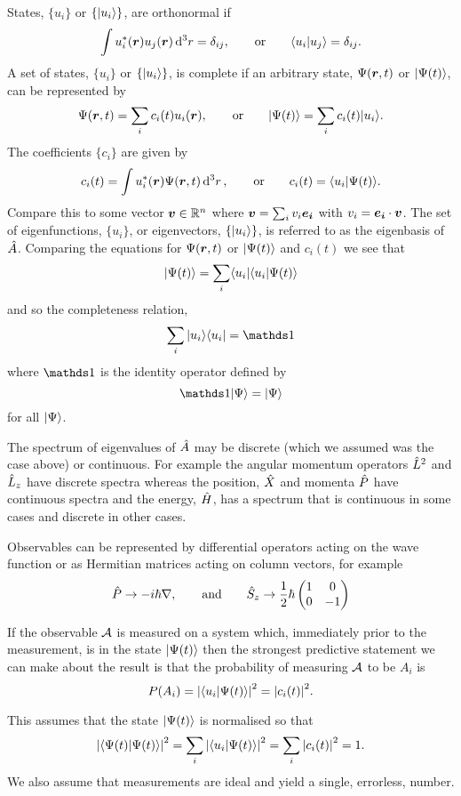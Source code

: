 States, \(\{u_i\}\) or \(\{\vert {u_i} \rangle\}\), are orthonormal if
\[\int u_i^*(\bm{r})u_j(\bm{r}) \dd[3]{r} = \delta_{ij}, \qquad\text{or}\qquad \langle {u_i} \vert {u_j} \rangle = \delta_{ij}.\]
A set of states, \(\{u_i\}\) or \(\{\vert {u_i} \rangle\}\), is complete if an arbitrary state, \(\Psi(\bm{r}, t)\) or \(\vert {\Psi(t)} \rangle\), can be represented by
\[\Psi(\bm{r}, t) = \sum_{i} c_i(t)u_i(\bm{r}), \qquad\text{or}\qquad \vert {\Psi(t)} \rangle = \sum_{i} c_i(t)\vert {u_i} \rangle.\]
The coefficients \(\{c_i\}\) are given by
\[c_i(t) = \int u_i^{*}(\bm{r})\Psi(\bm{r}, t)\dd[3]{r}, \qquad\text{or}\qquad c_i(t) = \langle {u_i} \vert {\Psi(t)} \rangle.\]
Compare this to some vector \(\bm{v}\in\mathbb{R}^n\) where \(\bm{v} = \sum_i v_i\bm{e_{i}}\) with \(v_i = \bm{e_{i}}\cdot\bm{v}\).
The set of eigenfunctions, \(\{u_i\}\), or eigenvectors, \(\{\vert {u_i} \rangle\}\), is referred to as the eigenbasis of \(\hat{A}\).
Comparing the equations for \(\Psi(\bm{r}, t)\) or \(\vert {\Psi(t)} \rangle\) and \(c_i(t)\) we see that
\[\vert {\Psi(t)} \rangle = \sum_{i} \langle {u_i} \vert\langle {u_i} \vert {\Psi(t)} \rangle\]
and so the completeness relation,
\[\sum_{i}\ket{u_i}\bra{u_i} = \ident\]
where \(\ident\) is the identity operator defined by
\[\ident\ket{\Psi} = \ket{\Psi}\]
for all \(\vert {\Psi} \rangle\).

The spectrum of eigenvalues of \(\hat{A}\) may be discrete (which we assumed was the case above) or continuous.
For example the angular momentum operators \(\hat{L}^2\) and \(\hat{L}_z\) have discrete spectra whereas the position, \(\hat{X}\) and momenta \(\hat{P}\) have continuous spectra and the energy, \(\hat{H}\), has a spectrum that is continuous in some cases and discrete in other cases.

Observables can be represented by differential operators acting on the wave function or as Hermitian matrices acting on column vectors, for example
\[
\hat{P} \mathrel{\rightarrow} -i\hbar\nabla, \qquad\text{and}\qquad \hat{S}_z \mathrel{\rightarrow} \frac{1}{2}\hbar
\begin{pmatrix}
    1 & 0\\
    0 & -1
\end{pmatrix}
\]

\begin{postulate}{}{}
    If the observable \(\mathcal{A}\) is measured on a system which, immediately prior to the measurement, is in the state \(\vert {\Psi(t)} \rangle\) then the strongest predictive statement we can make about the result is that the probability of measuring \(\mathcal{A}\) to be \(A_i\) is
    \[P(A_i) = \abs{\langle {u_i} \vert {\Psi(t)} \rangle}^2 = \abs{c_i(t)}^2.\]
\end{postulate}
This assumes that the state \(\vert {\Psi(t)} \rangle\) is normalised so that
\[\abs{\langle {\Psi(t)} \vert {\Psi(t)} \rangle}^2 = \sum_i \abs{\langle {u_i} \vert {\Psi(t)} \rangle}^2 = \sum_i \abs{c_i(t)}^2 = 1.\]
We also assume that measurements are ideal and yield a single, errorless, number.

